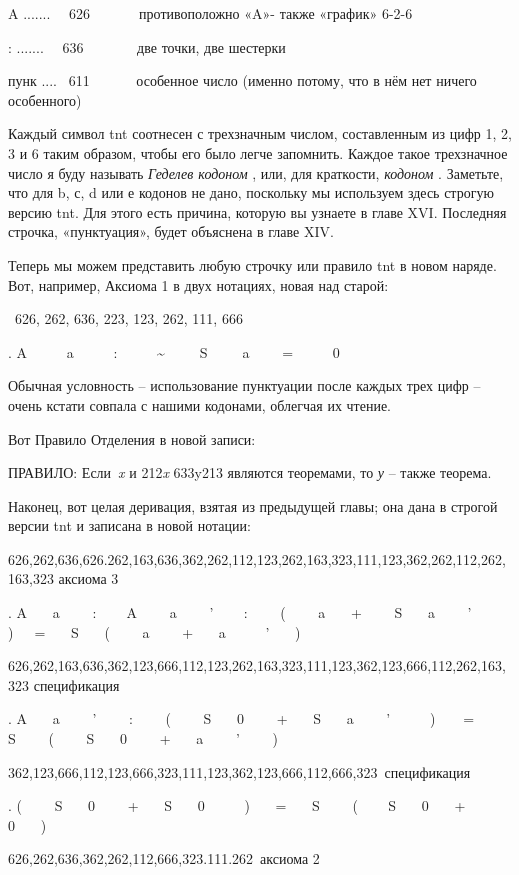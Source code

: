 \documentclass[../main.tex]{subfiles}
\begin{document}
A .......~~ 626~~~~~~~противоположно «A»- также «график» 6-2-6

: .......~~ 636~~~~~~~ две точки, две шестерки

пунк ....~ 611~~~~~~ особенное число (именно потому, что в нём нет ничего особенного)

Каждый символ \acs{tnt} соотнесен с трехзначным числом, составленным из цифр 1, 2, 3 и 6 таким образом, чтобы его было легче запомнить. Каждое такое трехзначное число я буду называть \emph{Геделев кодоном} , или, для краткости, \emph{кодоном} . Заметьте, что для b, с, d или е кодонов не дано, поскольку мы используем здесь строгую версию \acs{tnt}\@. Для этого есть причина, которую вы узнаете в главе XVI\@. Последняя строчка, «пунктуация», будет объяснена в главе XIV.

Теперь мы можем представить любую строчку или правило \acs{tnt} в новом наряде. Вот, например, Аксиома 1 в двух нотациях, новая над старой:

~626, 262, 636, 223, 123, 262, 111, 666

. A~~~~~ a~~~~ ~:~~~~~ \textasciitilde~~~~~S~~~~~a~~~~ =~~~~~ 0

Обычная условность \--- использование пунктуации после каждых трех цифр \--- очень кстати совпала с нашими кодонами, облегчая их чтение.

Вот Правило Отделения в новой записи:

ПРАВИЛО: Если~\emph{x} и 212\emph{x} 633y213 являются теоремами, то \emph{у} \--- также теорема.

Наконец, вот целая деривация, взятая из предыдущей главы; она дана в строгой версии \acs{tnt} и записана в новой нотации:

626,262,636,626.262,163,636,362,262,112,123,262,163,323,111,123,362,262,112,262,163,323 аксиома 3

. A~~~ a~~~~ :~ ~~ A~~~ ~a~~~~ '~~ ~ :~~~~ (~~~ ~a~~~ +~~~~ S~~~ a~~~~ '~~~~ )~~~=~~~ S~~~ (~~~~ a~~~~ +~~~ a~~~~~ '~~~ )

626,262,163,636,362,123,666,112,123,262,163,323,111,123,362,123,666,112,262,163,323 спецификация

. A~~~ a~~~~ '~~~~ :~~~~ (~~~~ S~~ ~0~~~~ +~~~ S~~~ a~~~~ '~~~~~ )~~~~=~~~ S~~~~ (~~~~ S~~~ 0~~~~ +~~~ a~~~~ '~~~~ )

362,123,666,112,123,666,323,111,123,362,123,666,112,666,323~спецификация

. (~~~~ S~~~ 0~~~~ +~~~ S~~~ 0~~~~~ )~~~ =~~~ S~~~~ ( ~~~ S~~~ 0~~~ +~~~~ 0~~~ )

626,262,636,362,262,112,666,323.111.262~аксиома 2
\end{document}
